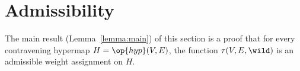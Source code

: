 %
%





\section{Admissibility}




The main result (Lemma~\ref{lemma:main}) of this section is a proof
that for every contravening hypermap $H=\op{hyp}(V,E)$, the function
$\tau(V,E,\wild)$ is an admissible weight assignment on $H$.



